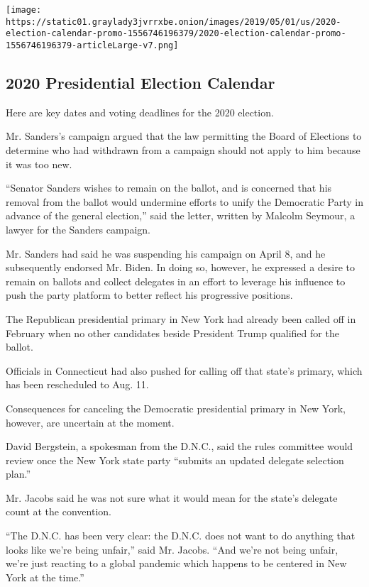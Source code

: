 \href{https://www.nytimes3xbfgragh.onion/interactive/2019/us/elections/2020-presidential-election-calendar.html}{}

\texttt{[image: https://static01.graylady3jvrrxbe.onion/images/2019/05/01/us/2020-election-calendar-promo-1556746196379/2020-election-calendar-promo-1556746196379-articleLarge-v7.png]}

\hypertarget{2020-presidential-election-calendar}{%
\subsection{2020 Presidential Election
Calendar}\label{2020-presidential-election-calendar}}

Here are key dates and voting deadlines for the 2020 election.

Mr. Sanders's campaign argued that the law permitting the Board of
Elections to determine who had withdrawn from a campaign should not
apply to him because it was too new.

``Senator Sanders wishes to remain on the ballot, and is concerned that
his removal from the ballot would undermine efforts to unify the
Democratic Party in advance of the general election,'' said the letter,
written by Malcolm Seymour, a lawyer for the Sanders campaign.

Mr. Sanders had said he was suspending his campaign on April 8, and he
subsequently endorsed Mr. Biden. In doing so, however, he expressed a
desire to remain on ballots and collect delegates in an effort to
leverage his influence to push the party platform to better reflect his
progressive positions.

The Republican presidential primary in New York had already been called
off in February when no other candidates beside President Trump
qualified for the ballot.

Officials in Connecticut had also pushed for calling off that state's
primary, which has been rescheduled to Aug. 11.

Consequences for canceling the Democratic presidential primary in New
York, however, are uncertain at the moment.

David Bergstein, a spokesman from the D.N.C., said the rules committee
would review once the New York state party ``submits an updated delegate
selection plan.''

Mr. Jacobs said he was not sure what it would mean for the state's
delegate count at the convention.

``The D.N.C. has been very clear: the D.N.C. does not want to do
anything that looks like we're being unfair,'' said Mr. Jacobs. ``And
we're not being unfair, we're just reacting to a global pandemic which
happens to be centered in New York at the time.''

